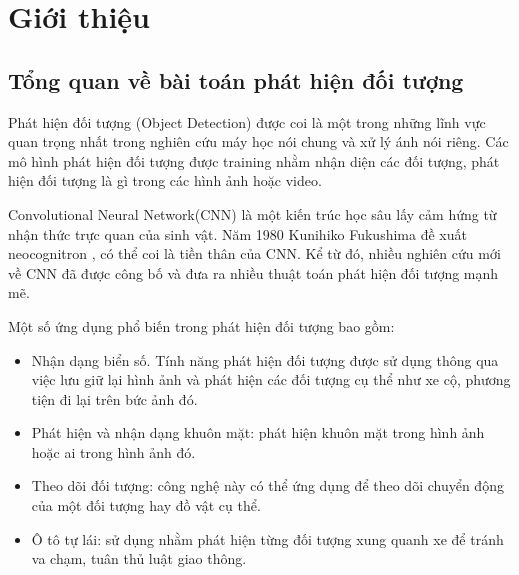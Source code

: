 \section{Giới thiệu}
\label{sec:introduction}

\subsection{Tổng quan về bài toán phát hiện đối tượng}

Phát hiện đối tượng (Object Detection) được coi là một trong những lĩnh vực quan trọng nhất trong nghiên cứu máy học nói chung và xử lý ánh nói riêng. Các mô hình phát hiện đối tượng được training nhằm nhận diện các đối tượng, phát hiện đối tượng là gì trong các hình ảnh hoặc video.

Convolutional Neural Network(CNN) là một kiến trúc học sâu lấy cảm hứng từ nhận thức trực quan của sinh vật. Năm 1980 Kunihiko Fukushima\cite{fukushima1980self} đề xuất neocognitron , có thể coi là tiền thân của CNN. Kể từ đó, nhiều nghiên cứu mới về CNN đã được công bố và đưa ra nhiều thuật toán phát hiện đối tượng mạnh mẽ.

Một số ứng dụng phổ biến trong phát hiện đối tượng bao gồm:
\begin{itemize}
    \item Nhận dạng biển số. Tính năng phát hiện đối tượng được sử dụng thông qua việc lưu giữ lại hình ảnh và phát hiện các đối tượng cụ thể như xe cộ, phương tiện đi lại trên bức ảnh đó.
    \item Phát hiện và nhận dạng khuôn mặt: phát hiện khuôn mặt trong hình ảnh hoặc ai trong hình ảnh đó.
    \item Theo dõi đối tượng: công nghệ này có thể ứng dụng để theo dõi chuyển động của một đối tượng hay đồ vật cụ thể.
    \item Ô tô tự lái: sử dụng nhằm phát hiện từng đối tượng xung quanh xe để tránh va chạm, tuân thủ luật giao thông.
\end{itemize}
